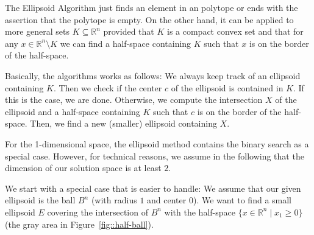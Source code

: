 \documentclass[12pt, showidx, twoside]{article}
\def\R{\mathbb{R}}
\begin{document}
{{{The {\sc Ellipsoid Algorithm}
just finds an element in an polytope or ends with the
assertion that the polytope is empty. On the other hand,
it can be applied to more general sets $K \subseteq \R^n$
provided that $K$ is a compact convex set and that for
any $x \in \R^n\setminus K$ we can find a half-space
containing $K$ such that $x$ is on the border of the half-space.

Basically, the algorithms works as follows: 
We always keep track of an ellipsoid containing $K$. 
Then we check if the center $c$ of the ellipsoid is 
contained in $K$. If this is the case, we are done.
Otherwise, we compute the intersection $X$ of the ellipsoid and
a half-space containing $K$ such that $c$ is on the border
of the half-space. Then, we find a new (smaller) ellipsoid
containing $X$.

For the 1-dimensional space, the ellipsoid method contains
the binary search as a special case. However, for technical
reasons, we assume in the following that the dimension of
our solution space is at least $2$.












We start with a special case that is easier to handle: 
We assume that our given
ellipsoid is the ball $B^n$ (with radius $1$ and center $0$).
We want to find a small ellipsoid $E$ covering the intersection of
$B^n$ with the half-space $\{x \in \R^n \mid x_1 \geq 0\}$ (the
gray area in Figure~\ref{fig::half-ball}).

\begin{figure}[htb]
\begin{center}
\end{center}
\end{figure}}}}
\end{document}
